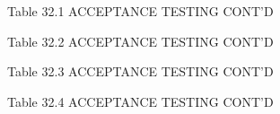 Table 32.1
ACCEPTANCE TESTING CONT’D
   











Table 32.2
ACCEPTANCE TESTING CONT’D
   







































Table 32.3
ACCEPTANCE TESTING CONT’D
   

















































Table 32.4
ACCEPTANCE TESTING CONT’D

   













